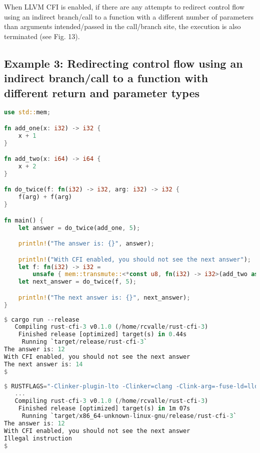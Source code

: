 \documentclass{article}
\begin{document}
When LLVM CFI is enabled, if there are any attempts to redirect control flow using an indirect branch/call to a function with a different number of parameters than arguments intended/passed in the call/branch site, the execution is also terminated (see Fig. 13).


\subsection{Example 3: Redirecting control flow using an indirect branch/call to a function with different return and parameter types}

\begin{lstlisting}[language=Rust, caption={Redirecting control flow using an indirect branch/call to a function with different return and parameter types than the return type expected and arguments intended/passed at the call/branch site.}]
use std::mem;

fn add_one(x: i32) -> i32 {
    x + 1
}

fn add_two(x: i64) -> i64 {
    x + 2
}

fn do_twice(f: fn(i32) -> i32, arg: i32) -> i32 {
    f(arg) + f(arg)
}

fn main() {
    let answer = do_twice(add_one, 5);

    println!("The answer is: {}", answer);

    println!("With CFI enabled, you should not see the next answer");
    let f: fn(i32) -> i32 =
        unsafe { mem::transmute::<*const u8, fn(i32) -> i32>(add_two as *const u8) };
    let next_answer = do_twice(f, 5);

    println!("The next answer is: {}", next_answer);
}
\end{lstlisting}

\begin{lstlisting}[language=Rust, caption={Build and execution of Fig. 14 with LLVM CFI disabled.}]
$ cargo run --release
   Compiling rust-cfi-3 v0.1.0 (/home/rcvalle/rust-cfi-3)
    Finished release [optimized] target(s) in 0.44s
     Running `target/release/rust-cfi-3`
The answer is: 12
With CFI enabled, you should not see the next answer
The next answer is: 14
$
\end{lstlisting}

\begin{lstlisting}[language=Rust, caption={Build and execution of Fig. 14 with LLVM CFI enabled.}]
$ RUSTFLAGS="-Clinker-plugin-lto -Clinker=clang -Clink-arg=-fuse-ld=lld -Zsanitizer=cfi" cargo run -Zbuild-std -Zbuild-std-features --release --target x86_64-unknown-linux-gnu
   ...
   Compiling rust-cfi-3 v0.1.0 (/home/rcvalle/rust-cfi-3)
    Finished release [optimized] target(s) in 1m 07s
     Running `target/x86_64-unknown-linux-gnu/release/rust-cfi-3`
The answer is: 12
With CFI enabled, you should not see the next answer
Illegal instruction
$
\end{lstlisting}
\end{document}
